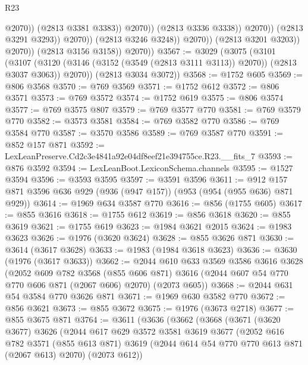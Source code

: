 \begin{lexlean}{R23}
\begin{coremodule}
                                            @2070))
                                        (@2813 @3381 @3383))
                                      @2070))
                                  (@2813 @3336 @3338))
                                @2070))
                            (@2813 @3291 @3293))
                          @2070))
                      (@2813 @3246 @3248))
                    @2070))
                (@2813 @3201 @3203))
              @2070))
          (@2813 @3156 @3158))
        @2070))
@3567 := @3029
    (@3075
      (@3101
        (@3107 (@3120 (@3146 (@3152 (@3549 (@2813 @3111 @3113)) @2070)) (@2813 @3037 @3063)) @2070))
      (@2813 @3034 @3072))
@3568 := @1752 @605
@3569 := @806 @3568
@3570 := @769 @3569
@3571 := @1752 @612
@3572 := @806 @3571
@3573 := @769 @3572
@3574 := @1752 @619
@3575 := @806 @3574
@3577 := @769 @3575 @807
@3579 := @769 @3577 @770
@3581 := @769 @3579 @770
@3582 := @3573 @3581
@3584 := @769 @3582 @770
@3586 := @769 @3584 @770
@3587 := @3570 @3586
@3589 := @769 @3587 @770
@3591 := @852 @157 @871
@3592 := LexLeanPreserve.Cd2c3e4841a92e04df8eef21e394755ce.R23.__fits_7
@3593 := @876 @3592
@3594 := LexLeanBoot.LexiconSchema.channels
@3595 := @1527 @3594
@3596 := @3593 @3595
@3597 := @3591 @3596
@3611 := @912 @157 @871 @3596 @636 @929 (@936 (@947 @157)) (@953 (@954 (@955 @636) @871 @929))
@3614 := @1969 @634 @3587 @770
@3616 := @856 (@1755 @605)
@3617 := @855 @3616
@3618 := @1755 @612
@3619 := @856 @3618
@3620 := @855 @3619
@3621 := @1755 @619
@3623 := @1984 @3621 @2015
@3624 := @1983 @3623
@3626 := @1976 (@3620 @3624)
@3628 := @855 @3626 @871
@3630 := @3614 (@3617 @3628)
@3633 := @1983 (@1984 @3618 @3623)
@3636 := @3630 (@1976 (@3617 @3633))
@3662 := @2044
    @610
    @633
    @3569
    @3586
    @3616
    @3628
    (@2052
      @609
      @782
      @3568
      (@855 @606 @871)
      @3616
      (@2044 @607 @54 @770 @770 @606 @871 (@2067 @606) @2070)
      (@2073 @605))
@3668 := @2044 @631 @54 @3584 @770 @3626 @871
@3671 := @1969 @630 @3582 @770
@3672 := @856 @3621
@3673 := @855 @3672
@3675 := @1976 (@3673 @2718)
@3677 := @855 @3675 @871
@3764 := @3611
    (@3636
      (@3662
        (@3668
          (@3671
            (@3620 @3677)
            @3626
            (@2044
              @617
              @629
              @3572
              @3581
              @3619
              @3677
              (@2052
                @616
                @782
                @3571
                (@855 @613 @871)
                @3619
                (@2044 @614 @54 @770 @770 @613 @871 (@2067 @613) @2070)
                (@2073 @612))

\end{coremodule}
\end{lexlean}
